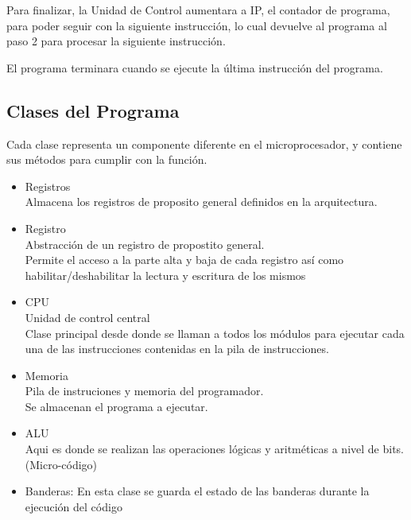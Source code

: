 \documentclass[conference]{IEEEtran}
\begin{document}
Para finalizar, la Unidad de Control aumentara
a IP, el contador de programa, para poder
seguir con la siguiente instrucción, lo cual
devuelve al programa al paso 2 para procesar la
siguiente instrucción.

 El programa terminara cuando se ejecute la
última instrucción del programa.
\subsection{Clases del Programa}
Cada clase representa un componente diferente en el
microprocesador, y contiene sus métodos para cumplir
con la función.

\begin{itemize}
    \item Registros\\
    Almacena los registros de proposito general definidos en la arquitectura.
    \item Registro\\
    Abstracción de un registro de propostito general.\\
    Permite el acceso a la parte alta y baja de cada registro así como habilitar/deshabilitar la lectura y escritura de los mismos 
    \item CPU\\
    Unidad de control central\\
    Clase principal desde donde se llaman a todos los módulos para ejecutar cada una de las 
    instrucciones contenidas en la pila de instrucciones. 
    \item  Memoria \\
    Pila de instruciones y memoria del programador.\\
    Se almacenan el programa a ejecutar. 
    \item ALU    \\
    Aqui es donde se realizan las operaciones lógicas y aritméticas a nivel de bits. (Micro-código) 
    \item Banderas: 
    En esta clase se guarda el estado de las banderas durante la ejecución del código 
\end{itemize}
\end{document}
